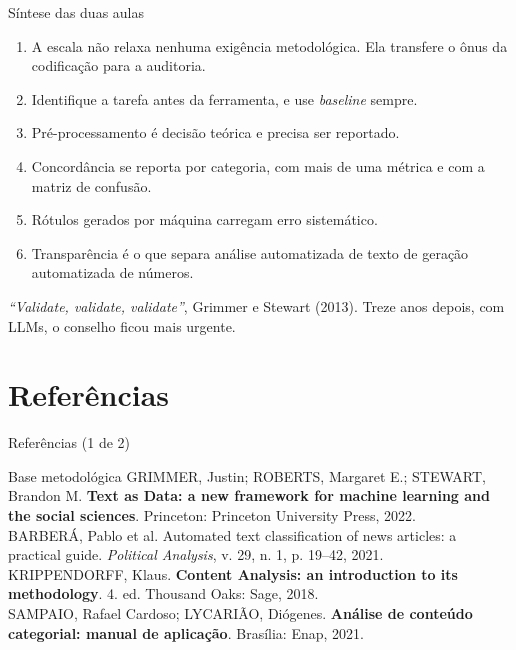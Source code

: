 \documentclass[11pt,aspectratio=169]{beamer}
\begin{document}
\begin{frame}{Síntese das duas aulas}
\begin{enumerate}
  \item A escala não relaxa nenhuma exigência metodológica. Ela transfere o ônus
        da codificação para a auditoria.
  \item Identifique a tarefa antes da ferramenta, e use \emph{baseline} sempre.
  \item Pré-processamento é decisão teórica e precisa ser reportado.
  \item Concordância se reporta por categoria, com mais de uma métrica e com a
        matriz de confusão.
  \item Rótulos gerados por máquina carregam erro sistemático.
  \item Transparência é o que separa análise automatizada de texto de geração
        automatizada de números.
\end{enumerate}
\vspace{0.2cm}
\centering
\small \textit{``Validate, validate, validate''}, Grimmer e Stewart (2013).
Treze anos depois, com LLMs, o conselho ficou mais urgente.
\end{frame}

\section*{Referências}

\begin{frame}{Referências (1 de 2)}
\scriptsize
\begin{block}{Base metodológica}
GRIMMER, Justin; ROBERTS, Margaret E.; STEWART, Brandon M. \textbf{Text as Data:
a new framework for machine learning and the social sciences}. Princeton:
Princeton University Press, 2022.\\[2pt]
BARBERÁ, Pablo et al. Automated text classification of news articles: a
practical guide. \textit{Political Analysis}, v. 29, n. 1, p. 19--42, 2021.\\[2pt]
KRIPPENDORFF, Klaus. \textbf{Content Analysis: an introduction to its
methodology}. 4. ed. Thousand Oaks: Sage, 2018.\\[2pt]
SAMPAIO, Rafael Cardoso; LYCARIÃO, Diógenes. \textbf{Análise de conteúdo
categorial: manual de aplicação}. Brasília: Enap, 2021.
\end{block}
\end{frame}
\end{document}
